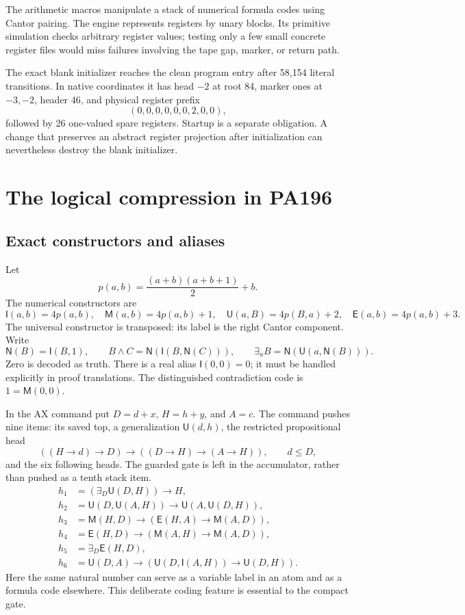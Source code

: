 \documentclass[11pt,a4paper]{article}
\newcommand{\NN}{\mathsf{N}}
\newcommand{\UU}{\mathsf{U}}
\newcommand{\EE}{\mathsf{E}}
\newcommand{\MM}{\mathsf{M}}
\newcommand{\II}{\mathsf{I}}
\begin{document}
The arithmetic macros manipulate a stack of numerical formula codes using Cantor pairing. The engine represents registers by unary blocks. Its primitive simulation checks arbitrary register values; testing only a few small concrete register files would miss failures involving the tape gap, marker, or return path.

The exact blank initializer reaches the clean program entry after 58,154 literal transitions. In native coordinates it has head $-2$ at root 84, marker ones at $-3,-2$, header 46, and physical register prefix
\[
(0,0,0,0,0,0,2,0,0),
\]
followed by 26 one-valued spare registers. Startup is a separate obligation. A change that preserves an abstract register projection after initialization can nevertheless destroy the blank initializer.

\section{The logical compression in PA196}

\subsection{Exact constructors and aliases}

Let
\[
p(a,b)=\frac{(a+b)(a+b+1)}{2}+b.
\]
The numerical constructors are
\[
\II(a,b)=4p(a,b),\quad \MM(a,b)=4p(a,b)+1,\quad
\UU(a,B)=4p(B,a)+2,\quad \EE(a,b)=4p(a,b)+3.
\]
The universal constructor is transposed: its label is the right Cantor component. Write
\[
\NN(B)=\II(B,1),\qquad B\wedge C=\NN(\II(B,\NN(C))),\qquad
\exists_a B=\NN(\UU(a,\NN(B))).
\]
Zero is decoded as truth. There is a real alias $\II(0,0)=0$; it must be handled explicitly in proof translations. The distinguished contradiction code is $1=\MM(0,0)$.

In the AX command put $D=d+x$, $H=h+y$, and $A=c$. The command pushes nine items: its saved top, a generalization $\UU(d,h)$, the restricted propositional head
\[
((H\to d)\to D)\to((D\to H)\to(A\to H)),\qquad d\leq D,
\]
and the six following heads. The guarded gate is left in the accumulator, rather than pushed as a tenth stack item.
\begin{align*}
 h_1&=(\exists_D\UU(D,H))\to H,\\
 h_2&=\UU(D,\UU(A,H))\to\UU(A,\UU(D,H)),\\
 h_3&=\MM(H,D)\to(\EE(H,A)\to\MM(A,D)),\\
 h_4&=\EE(H,D)\to(\MM(A,H)\to\MM(A,D)),\\
 h_5&=\exists_D\EE(H,D),\\
 h_6&=\UU(D,A)\to(\UU(D,\II(A,H))\to\UU(D,H)).
\end{align*}
Here the same natural number can serve as a variable label in an atom and as a formula code elsewhere. This deliberate coding feature is essential to the compact gate.
\end{document}
